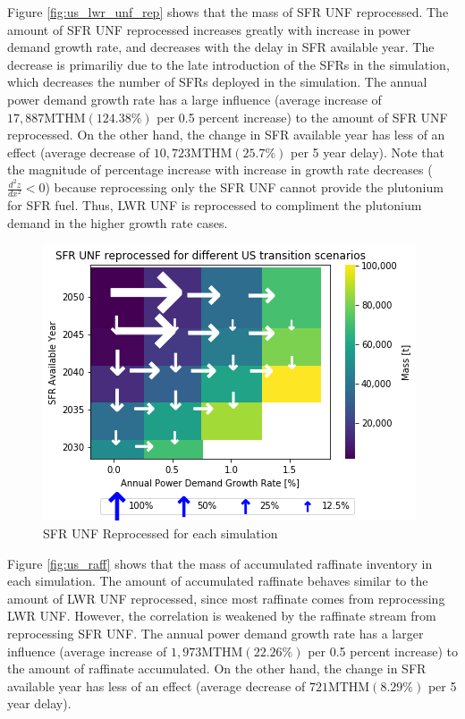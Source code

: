 Figure \ref{fig:us_lwr_unf_rep} shows that the mass of \gls{SFR} \gls{UNF} reprocessed.
The amount of \gls{SFR} \gls{UNF} reprocessed increases greatly with increase
in power demand growth rate, and decreases with the delay in
\gls{SFR} available year. The decrease is primariliy due to
the late introduction of the \glspl{SFR} in the simulation, which decreases the number of \glspl{SFR} deployed in the simulation. The annual power demand
growth rate has a large influence (average increase of $17,887 \text{MTHM} (124.38 \%)$ 
per 0.5 percent increase) to the amount of \gls{SFR} \gls{UNF}
reprocessed. On the other hand, the change in  \gls{SFR} available year
has less of an effect (average decrease of $10,723 \text{MTHM} (25.7\%)$
per 5 year delay). Note that the magnitude of percentage increase
with increase in growth rate decreases ($\frac{d^2z}{dx^2} < 0$)
because reprocessing only the \gls{SFR} \gls{UNF} cannot provide
the plutonium for \gls{SFR} fuel. Thus, \gls{LWR} \gls{UNF} is
reprocessed to compliment the plutonium demand in the higher
growth rate cases.

\begin{figure}[htbp!]
    \begin{center}
        \includegraphics[scale=0.7]{./images/us/scat_both_SFR_UNF_reprocessed.png}
    \end{center}
        \caption{\gls{SFR} \gls{UNF} Reprocessed for each simulation}
    \label{fig:us_sfr_unf_rep}
\end{figure}



Figure \ref{fig:us_raff} shows that the mass of accumulated
raffinate inventory in each simulation. 
The amount of accumulated raffinate behaves similar to the
amount of \gls{LWR} \gls{UNF} reprocessed, since most 
raffinate comes from reprocessing \gls{LWR} \gls{UNF}. However, the correlation is weakened by the raffinate stream from reprocessing \gls{SFR} \gls{UNF}. The annual power demand
growth rate has a larger influence (average increase of $1,973 \text{MTHM} (22.26 \%)$ 
per 0.5 percent increase) to the amount of raffinate accumulated. On the other hand, the change in  \gls{SFR} available year
has less of an effect (average decrease of $721 \text{MTHM} (8.29\%)$
per 5 year delay).


